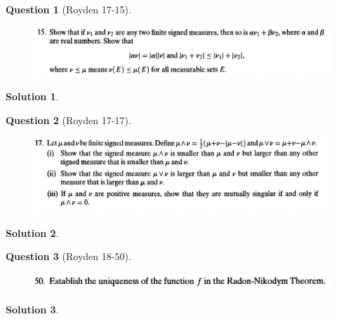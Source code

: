 \documentclass{article} %
\theoremstyle{quest}
\newtheorem*{question}{Question}
\newtheorem*{solution}{Solution}
\begin{document}
\newpage

\begin{question}[Royden 17-15]
\hfill
\begin{figure}[h!]
  \centering
    \includegraphics[width=1\textwidth]{rv-17-15.png}
\end{figure}
\end{question}
\begin{solution}
\end{solution}

\newpage

\begin{question}[Royden 17-17]
\hfill
\begin{figure}[h!]
  \centering
    \includegraphics[width=1\textwidth]{rv-17-17.png}
\end{figure}
\end{question}
\begin{solution}
\end{solution}

\newpage

\begin{question}[Royden 18-50]
\hfill
\begin{figure}[h!]
  \centering
    \includegraphics[width=1\textwidth]{rv-18-50.png}
\end{figure}
\end{question}
\begin{solution}
\end{solution}

\newpage
\end{document}
